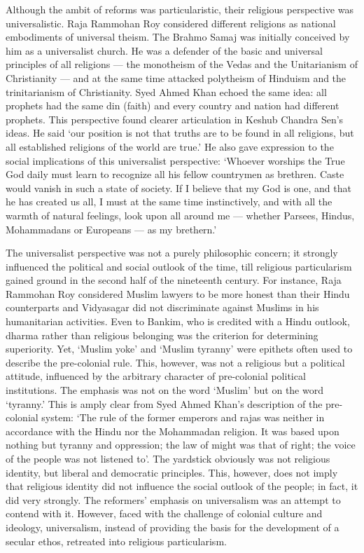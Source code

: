 Although the ambit of reforms was particularistic, their religious perspective was universalistic. Raja Rammohan Roy considered different religions as national embodiments of universal theism. The Brahmo Samaj was initially conceived by him as a universalist church. He was a defender of the basic and universal principles of all religions --- the monotheism of the Vedas and the Unitarianism of Christianity --- and at the same time attacked polytheism of Hinduism and the trinitarianism of Christianity. Syed Ahmed Khan echoed the same idea: all prophets had the same din (faith) and every country and nation had different prophets. This perspective found clearer articulation in Keshub Chandra Sen's ideas. He said `our position is not that truths are to be found in all religions, but all established religions of the world are true.' He also gave expression to the social implications of this universalist perspective: `Whoever worships the True God daily must learn to recognize all his fellow countrymen as brethren. Caste would vanish in such a state of society. If I believe that my God is one, and that he has created us all, I must at the same time instinctively, and with all the warmth of natural feelings, look upon all around me --- whether Parsees, Hindus, Mohammadans or Europeans --- as my brethern.'

The universalist perspective was not a purely philosophic concern; it strongly influenced the political and social outlook of the time, till religious particularism gained ground in the second half of the nineteenth century. For instance, Raja Rammohan Roy considered Muslim lawyers to be more honest than their Hindu counterparts and Vidyasagar did not discriminate against Muslims in his humanitarian activities. Even to Bankim, who is credited with a Hindu outlook, dharma rather than religious belonging was the criterion for determining superiority. Yet, `Muslim yoke' and `Muslim tyranny' were epithets often used to describe the pre-colonial rule. This, however, was not a religious but a political attitude, influenced by the arbitrary character of pre-colonial political institutions. The emphasis was not on the word `Muslim' but on the word `tyranny.' This is amply clear from Syed Ahmed Khan's description of the pre-colonial system: `The rule of the former emperors and rajas was neither in accordance with the Hindu nor the Mohammadan religion. It was based upon nothing but tyranny and oppression; the law of might was that of right; the voice of the people was not listened to'. The yardstick obviously was not religious identity, but liberal and democratic principles. This, however, does not imply that religious identity did not influence the social outlook of the people; in fact, it did very strongly. The reformers' emphasis on universalism was an attempt to contend with it. However, faced with the challenge of colonial culture and ideology, universalism, instead of providing the basis for the development of a secular ethos, retreated into religious particularism.

